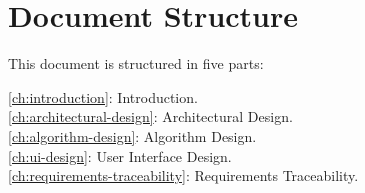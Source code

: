 \section{Document Structure}
\label{sec:structure}

This document is structured in five parts:
\begin{description}
\item[\autoref{ch:introduction}: Introduction.] %
\item[\autoref{ch:architectural-design}: Architectural Design.] %
\item[\autoref{ch:algorithm-design}: Algorithm Design.] %
\item[\autoref{ch:ui-design}: User Interface Design.] %
\item[\autoref{ch:requirements-traceability}: Requirements Traceability.] %
\end{description}
